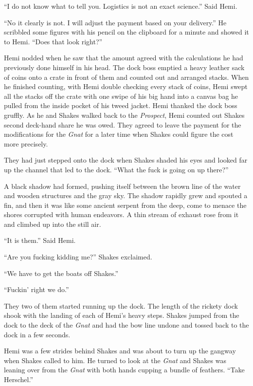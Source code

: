 \documentclass[]{scrbook}
\begin{document}
``I do not know what to tell you. Logistics is not an exact science.''
Said Hemi.

``No it clearly is not. I will adjust the payment based on your
delivery.'' He scribbled some figures with his pencil on the clipboard
for a minute and showed it to Hemi. ``Does that look right?''

Hemi nodded when he saw that the amount agreed with the calculations he
had previously done himself in his head. The dock boss emptied a heavy
leather sack of coins onto a crate in front of them and counted out and
arranged stacks. When he finished counting, with Hemi double checking
every stack of coins, Hemi swept all the stacks off the crate with one
swipe of his big hand into a canvas bag he pulled from the inside pocket
of his tweed jacket. Hemi thanked the dock boss gruffly. As he and
Shakes walked back to the \emph{Prospect}, Hemi counted out Shakes
second deck-hand share he was owed. They agreed to leave the payment for
the modifications for the \emph{Gnat} for a later time when Shakes could
figure the cost more precisely.

They had just stepped onto the dock when Shakes shaded his eyes and
looked far up the channel that led to the dock. ``What the fuck is going
on up there?''

A black shadow had formed, pushing itself between the brown line of the
water and wooden structures and the gray sky. The shadow rapidly grew
and spouted a fin, and then it was like some ancient serpent from the
deep, come to menace the shores corrupted with human endeavors. A thin
stream of exhaust rose from it and climbed up into the still air.

``It is them.'' Said Hemi.

``Are you fucking kidding me?'' Shakes exclaimed.

``We have to get the boats off Shakes.''

``Fuckin' right we do.''

They two of them started running up the dock. The length of the rickety
dock shook with the landing of each of Hemi's heavy steps. Shakes jumped
from the dock to the deck of the \emph{Gnat} and had the bow line undone
and tossed back to the dock in a few seconds.

Hemi was a few strides behind Shakes and was about to turn up the
gangway when Shakes called to him. He turned to look at the \emph{Gnat}
and Shakes was leaning over from the \emph{Gnat} with both hands cupping
a bundle of feathers. ``Take Herschel.''
\end{document}
